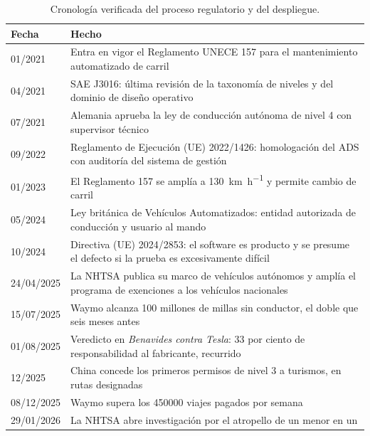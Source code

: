 \documentclass[11pt,letterpaper]{article}
\begin{document}
\begin{table}[tbp]
  \centering
  \small
  \caption{Cronología verificada del proceso regulatorio y del despliegue.}
  \label{tab:crono}
  \begin{tabularx}{\textwidth}{@{}l >{\raggedright\arraybackslash}X@{}}
    \toprule
    \textbf{Fecha} & \textbf{Hecho} \\
    \midrule
    01/2021 & Entra en vigor el Reglamento UNECE 157 para el mantenimiento
      automatizado de carril \parencite{unr157} \\
    04/2021 & SAE J3016: última revisión de la taxonomía de niveles y del
      dominio de diseño operativo \parencite{sae2021} \\
    07/2021 & Alemania aprueba la ley de conducción autónoma de nivel 4 con
      supervisor técnico \parencite{hoganlovells2021} \\
    09/2022 & Reglamento de Ejecución (UE) 2022/1426: homologación del ADS con
      auditoría del sistema de gestión \parencite{eu2022reg} \\
    01/2023 & El Reglamento 157 se amplía a \qty{130}{\kilo\meter\per\hour} y
      permite cambio de carril \parencite{unece2022} \\
    05/2024 & Ley británica de Vehículos Automatizados: entidad autorizada de
      conducción y usuario al mando \parencite{ukavact2024} \\
    10/2024 & Directiva (UE) 2024/2853: el software es producto y se presume el
      defecto si la prueba es excesivamente difícil \parencite{eupld2024} \\
    24/04/2025 & La NHTSA publica su marco de vehículos autónomos y amplía el
      programa de exenciones a los vehículos nacionales
      \parencite{nhtsa2025marco} \\
    15/07/2025 & Waymo alcanza 100 millones de millas sin conductor, el doble que
      seis meses antes \parencite{robotreport2025} \\
    01/08/2025 & Veredicto en \emph{Benavides contra Tesla}: 33 por ciento de
      responsabilidad al fabricante, recurrido \parencite{wshb2025} \\
    12/2025 & China concede los primeros permisos de nivel 3 a turismos, en
      rutas designadas \parencite{cnevpost2025} \\
    08/12/2025 & Waymo supera los \num{450000} viajes pagados por semana
      \parencite{cnbc2025rides} \\
    29/01/2026 & La NHTSA abre investigación por el atropello de un menor en un

\end{tabularx}
\end{table}
\end{document}
